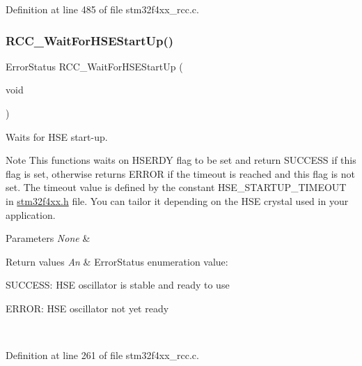 Definition at line 485 of file stm32f4xx\+\_\+rcc.\+c.

\mbox{\label{group___r_c_c___group1_gae0f15692614dd048ee4110a056f001dc}} 
\subsubsection{\texorpdfstring{R\+C\+C\+\_\+\+Wait\+For\+H\+S\+E\+Start\+Up()}{RCC\_WaitForHSEStartUp()}}
{\footnotesize\ttfamily Error\+Status R\+C\+C\+\_\+\+Wait\+For\+H\+S\+E\+Start\+Up (\begin{DoxyParamCaption}\item[{void}]{ }\end{DoxyParamCaption})}



Waits for H\+SE start-\/up. 

\begin{DoxyNote}{Note}
This functions waits on H\+S\+E\+R\+DY flag to be set and return S\+U\+C\+C\+E\+SS if this flag is set, otherwise returns E\+R\+R\+OR if the timeout is reached and this flag is not set. The timeout value is defined by the constant H\+S\+E\+\_\+\+S\+T\+A\+R\+T\+U\+P\+\_\+\+T\+I\+M\+E\+O\+UT in \hyperlink{stm32f4xx_8h}{stm32f4xx.\+h} file. You can tailor it depending on the H\+SE crystal used in your application. 
\end{DoxyNote}

\begin{DoxyParams}{Parameters}
{\em None} & \\
\hline
\end{DoxyParams}

\begin{DoxyRetVals}{Return values}
{\em An} & Error\+Status enumeration value\+:
\begin{DoxyItemize}
\item S\+U\+C\+C\+E\+SS\+: H\+SE oscillator is stable and ready to use
\item E\+R\+R\+OR\+: H\+SE oscillator not yet ready 
\end{DoxyItemize}\\
\hline
\end{DoxyRetVals}


Definition at line 261 of file stm32f4xx\+\_\+rcc.\+c.

